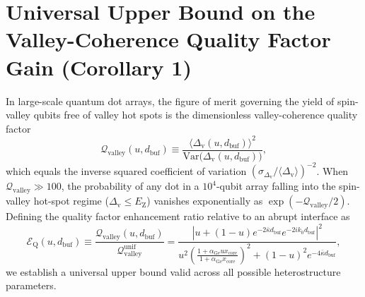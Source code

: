 \documentclass[11pt,letterpaper]{article}
\theoremstyle{definition}
\begin{document}
\section{Universal Upper Bound on the Valley-Coherence Quality Factor Gain (Corollary 1)}
\label{sec:corollary1}

In large-scale quantum dot arrays, the figure of merit governing the yield of spin-valley qubits free of valley hot spots is the dimensionless valley-coherence quality factor
\begin{equation}
  \mathcal{Q}_{\mathrm{valley}}(u, d_{\mathrm{buf}}) \equiv \frac{\langle \Delta_{\mathrm{v}}(u, d_{\mathrm{buf}}) \rangle^2}{\mathrm{Var}\bigl(\Delta_{\mathrm{v}}(u, d_{\mathrm{buf}})\bigr)},
  \label{eq:valley_quality_factor_def}
\end{equation}
which equals the inverse squared coefficient of variation $(\sigma_{\Delta_{\mathrm{v}}} / \langle\Delta_{\mathrm{v}}\rangle)^{-2}$. When $\mathcal{Q}_{\mathrm{valley}} \gg 100$, the probability of any dot in a $10^4$-qubit array falling into the spin-valley hot-spot regime ($\Delta_{\mathrm{v}} \le E_{\mathrm{Z}}$) vanishes exponentially as $\exp(-\mathcal{Q}_{\mathrm{valley}}/2)$. Defining the quality factor enhancement ratio relative to an abrupt interface as
\begin{equation}
  \mathcal{E}_{\mathrm{Q}}(u, d_{\mathrm{buf}}) \equiv \frac{\mathcal{Q}_{\mathrm{valley}}(u, d_{\mathrm{buf}})}{\mathcal{Q}_{\mathrm{valley}}^{\mathrm{unif}}} = \frac{\left| u + (1 - u) e^{-2\bar{\kappa} d_{\mathrm{buf}}} e^{-2i k_0 d_{\mathrm{buf}}} \right|^2}{u^2 \left(\frac{1 + \alpha_{\mathrm{Ge}} u x_{\mathrm{core}}}{1 + \alpha_{\mathrm{Ge}} x_{\mathrm{core}}}\right)^2 + (1 - u)^2 e^{-4\bar{\kappa} d_{\mathrm{buf}}}},
  \label{eq:eq_enhancement_def}
\end{equation}
we establish a universal upper bound valid across all possible heterostructure parameters.
\end{document}
